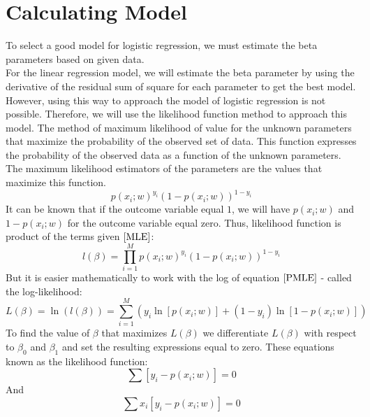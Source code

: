 \documentclass{article}
\begin{document}
\section {Calculating Model} 
    To select a good model for logistic regression, we must estimate the beta parameters based on given data. 
    \\
    For the linear regression model, we will estimate the beta parameter by using the derivative of the residual sum of square for each parameter to get the best model. However, using this way to approach the model of logistic regression is not possible. Therefore, we will use the likelihood function method to approach this model. The method of maximum likelihood of value for the unknown parameters that maximize the probability of the observed set of data. This function expresses the probability of the observed data as a function of the unknown parameters. The maximum likelihood estimators of the parameters are the values that maximize this function.
    \begin{equation} 
        \label{MLE}
        p(x_{i};w)^{y_{i}}(1 - p(x_{i}; w))^{1 - y_{i}}
    \end{equation}
    It can be known that if the outcome variable equal $1$, we will have $p(x_{i}; w)$ and $1 - p(x_{i}; w)$ for the outcome variable equal zero. Thus, likelihood function is product of the terms given $\ref{MLE}$: 
    \begin{equation} 
        \label{PMLE}
        l(\beta) = \prod_{i=1}^{M} p(x_{i}; w)^{y_{i}}(1 - p(x_{i}; w))^{1 - y_{i}}
    \end{equation}
    But it is easier mathematically to work with the log of equation $\ref{PMLE}$ - called the log-likelihood: 
    \begin{equation} 
        \label{LLH}
        L(\beta) = \ln(l(\beta)) = \sum_{i=1}^{M} (y_{i}\ln[p(x_{i}; w)] + (1 - y_{i})\ln[1 -  p(x_{i}; w)])
    \end{equation}
    To find the value of $\beta$ that maximizes $L(\beta)$ we differentiate $L(\beta)$ with respect to $\beta_{0}$ and $\beta_{1}$ and set the resulting expressions equal to zero. These equations known as the likelihood function: 
    \begin{equation} 
        \label{ELF1}
        \sum \left[y_{i} -  p(x_{i}; w) \right]  = 0
    \end{equation} 
    And
    \begin{equation} 
        \label{ELF2}
        \sum x_{i}  \left[y_{i} -  p(x_{i}; w) \right]  = 0
    \end{equation}
\end{document}
